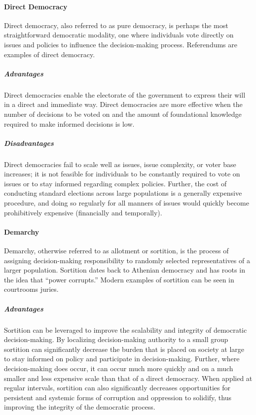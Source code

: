 \paragraph{Direct Democracy}
Direct democracy, also referred to as pure democracy, is perhaps the most
straightforward democratic modality, one where individuals vote directly on
issues and policies to influence the decision-making process. Referendums are
examples of direct democracy.

\subparagraph{Advantages} Direct democracies enable the electorate of the
government to express their will in a direct and immediate way. Direct
democracies are more effective when the number of decisions to be voted on and
the amount of foundational knowledge required to make informed decisions is low.

\subparagraph{Disadvantages} Direct democracies fail to scale well as
issues, issue complexity, or voter base increases; it is not feasible for
individuals to be constantly required to vote on issues or to stay informed
regarding complex policies. Further, the cost of conducting standard elections
across large populations is a generally expensive procedure, and doing so
regularly for all manners of issues would quickly become prohibitively
expensive (financially and temporally).


\paragraph{Demarchy}
Demarchy, otherwise referred to as allotment or sortition, is the process of
assigning decision-making responsibility to randomly selected representatives of
a larger population. Sortition dates back to Athenian democracy and has roots in
the idea that ``power corrupts.'' Modern examples of sortition can be seen in
courtrooms juries.

\subparagraph{Advantages} Sortition can be leveraged to improve the scalability
and integrity of democratic decision-making. By localizing decision-making
authority to a small group sortition can significantly decrease the burden that
is placed on society at large to stay informed on policy and participate in
decision-making. Further, where decision-making does occur, it can occur much
more quickly and on a much smaller and less expensive scale than that of a
direct democracy. When applied at regular intervals, sortition can also
significantly decreases opportunities for persistent and systemic forms of
corruption and oppression to solidify, thus improving the integrity of the
democratic process.

